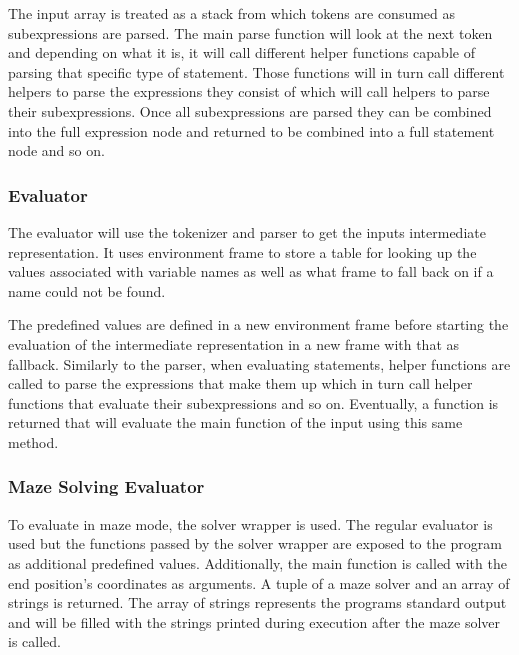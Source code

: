 The input array is treated as a stack from which tokens are consumed as subexpressions are parsed. The main parse function will look at the next token and depending on what it is, it will call different helper functions capable of parsing that specific type of statement. Those functions will in turn call different helpers to parse the expressions they consist of which will call helpers to parse their subexpressions. Once all subexpressions are parsed they can be combined into the full expression node and returned to be combined into a full statement node and so on.

\subsubsection{Evaluator}

The evaluator will use the tokenizer and parser to get the inputs intermediate representation. It uses environment frame to store a table for looking up the values associated with variable names as well as what frame to fall back on if a name could not be found.

The predefined values are defined in a new environment frame before starting the evaluation of the intermediate representation in a new frame with that as fallback. Similarly to the parser, when evaluating statements, helper functions are called to parse the expressions that make them up which in turn call helper functions that evaluate their subexpressions and so on. Eventually, a function is returned that will evaluate the main function of the input using this same method.

\subsubsection{Maze Solving Evaluator}

To evaluate in maze mode, the solver wrapper is used. The regular evaluator is used but the functions passed by the solver wrapper are exposed to the program as additional predefined values. Additionally, the main function is called with the end position's coordinates as arguments. A tuple of a maze solver and an array of strings is returned. The array of strings represents the programs standard output and will be filled with the strings printed during execution after the maze solver is called.
